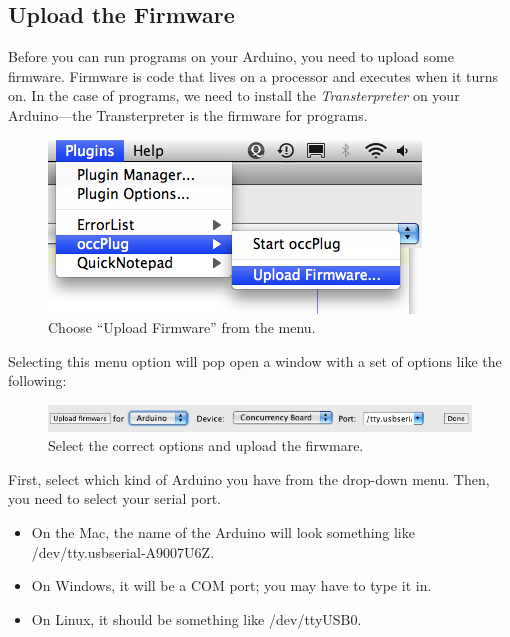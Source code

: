 \subsection{Upload the Firmware}
Before you can run \occam programs on your Arduino, you need to upload some firmware. {\strong Firmware} is code that lives on a processor and executes when it turns on. In the case of \occam programs, we need to install the {\em Transterpreter} on your Arduino---the Transterpreter is the firmware for \occam programs. 

\begin{figure}[!ht]
	\centering
		\includegraphics[width=0.6\linewidth]{ch0/images/20110115-upload-firmware}
	\caption{Choose ``Upload Firmware'' from the \occplug menu.}
	\label{images:20110115-upload-firmware}
\end{figure}

Selecting this menu option will pop open a window with a set of options like the following:

\begin{figure}[!ht]
	\centering
		\includegraphics[width=0.9\linewidth]{ch0/images/20110115-upload-firmware-window}
	\caption{Select the correct options and upload the firwmare.}
	\label{images:20110115-upload-firmware-window}
\end{figure}

First, select which kind of Arduino you have from the drop-down menu. Then, you need to select your serial port.

\begin{itemize}
	\item On the Mac, the name of the Arduino will look something like {\code /dev/tty.usbserial-A9007U6Z}. 
	\item On Windows, it will be a COM port; you may have to type it in.
	\item On Linux, it should be something like {\code /dev/ttyUSB0}.
\end{itemize}

